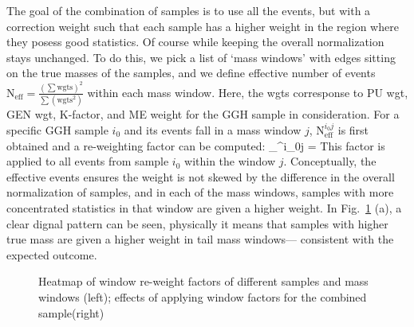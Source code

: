 The goal of the combination of samples is to use all the events, but with a correction weight
such that each sample has a higher weight in the region where they posess good statistics. Of
course while keeping the overall normalization stays unchanged. To do this, we pick a list of
`mass windows' with edges sitting on the true masses of the samples, and we define effective
number of events $\mathrm{N}_\mathrm{eff} = \frac{(\sum\mathrm{wgts})^2}{\sum(\mathrm{wgts}^2)}$
within each mass window. Here, the wgts corresponse to PU wgt, GEN wgt, K-factor, and ME weight for
the GGH sample in consideration. For a specific GGH sample $i_0$ and its events fall in a mass 
window $j$, $\mathrm{N}_\mathrm{eff}^{i_0j}$ is first obtained and a re-weighting factor can be computed:
\be
{}_^{i_0j} = 
\ee
This factor is applied to all events from sample $i_0$ within the window $j$. Conceptually,
the effective events ensures the weight is not skewed by the difference in the overall
normalization of samples, and in each of the mass windows, samples with more concentrated
statistics in that window are given a higher weight. In Fig.~\ref{fig:window_wgt_matrix} (a), a
clear dignal pattern can be seen, physically it means that samples with higher true 
mass are given a higher weight in tail mass windows--- consistent with the expected outcome.
\begin{figure}[htb]
\begin{center}
\end{center}
\caption{Heatmap of window re-weight factors of different samples and mass windows (left);
effects of applying window factors for the combined sample(right)}
\label{fig:window_wgt_matrix}
\end{figure}

